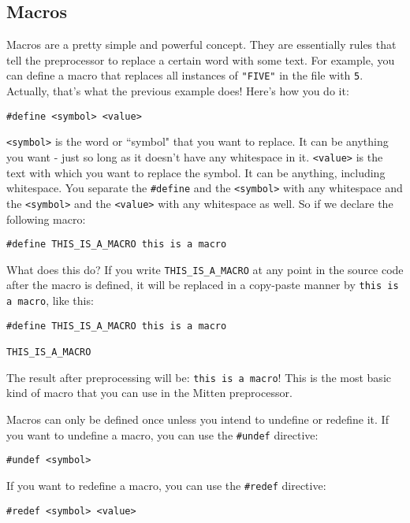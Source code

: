 \documentclass[10pt,a4paper]{article}
\begin{document}
\newpage




\subsection{Macros}
Macros are a pretty simple and powerful concept. They are essentially rules that tell the preprocessor to replace a certain word with some text. For example, you can define a macro that replaces all instances of \verb|"FIVE"| in the file with \verb|5|. Actually, that's what the previous example does! Here's how you do it:
\begin{verbatim}
#define <symbol> <value>
\end{verbatim}

\verb|<symbol>| is the word or ``symbol" that you want to replace. It can be anything you want - just so long as it doesn't have any whitespace in it. \verb|<value>| is the text with which you want to replace the symbol. It can be anything, including whitespace. You separate the \verb|#define| and the \verb|<symbol>| with any whitespace and the \verb|<symbol>| and the \verb|<value>| with any whitespace as well. So if we declare the following macro:
\begin{verbatim}
#define THIS_IS_A_MACRO this is a macro
\end{verbatim}

What does this do? If you write \verb|THIS_IS_A_MACRO| at any point in the source code after the macro is defined, it will be replaced in a copy-paste manner by \verb|this is a macro|, like this:
\begin{verbatim}
#define THIS_IS_A_MACRO this is a macro

THIS_IS_A_MACRO
\end{verbatim}

The result after preprocessing will be: \verb|this is a macro|! This is the most basic kind of macro that you can use in the Mitten preprocessor. 

Macros can only be defined once unless you intend to undefine or redefine it. If you want to undefine a macro, you can use the \verb|#undef| directive:
\begin{verbatim}
#undef <symbol>
\end{verbatim}

If you want to redefine a macro, you can use the \verb|#redef| directive:
\begin{verbatim}
#redef <symbol> <value>
\end{verbatim}
\end{document}
